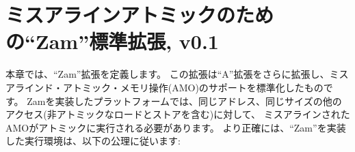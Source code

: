 \begin{comment}
\chapter{``Zam'' Standard Extension for Misaligned Atomics, v0.1}
\end{comment}
\chapter{ミスアラインアトミックのための``Zam''標準拡張, v0.1}
\label{sec:zam}

\begin{comment}
This chapter defines the ``Zam'' extension, which extends the ``A'' extension by standardizing support for misaligned atomic memory operations (AMOs).
On platforms implementing ``Zam'', misaligned AMOs need only execute atomically with respect
to other accesses (including non-atomic loads and stores) to the same address and of the same size.
More precisely, execution environments implementing ``Zam'' are subject to the following axiom:
\newcommand{\misalignedatomicityaxiom}{If $r$ and $w$ are paired misaligned load and store instructions from a hart $h$ with the same address and of the same size, then there can be no store instruction $s$ from a hart other than $h$ with the same address and of the same size as $r$ and $w$ such that a store operation generated by $s$ lies in between memory operations generated by $r$ and $w$ in the global memory order.  Furthermore, there can be no load instruction $l$ from a hart other than $h$ with the same address and of the same size as $r$ and $w$ such that a load operation generated by $l$ lies between two memory operations generated by $r$ or by $w$ in the global memory order.}
\end{comment}
本章では、``Zam''拡張を定義します。
この拡張は``A''拡張をさらに拡張し、ミスアラインド・アトミック・メモリ操作(AMO)のサポートを標準化したものです。
Zamを実装したプラットフォームでは、同じアドレス、同じサイズの他のアクセス(非アトミックなロードとストアを含む)に対して、
ミスアラインされたAMOがアトミックに実行される必要があります。
より正確には、``Zam''を実装した実行環境は、以下の公理に従います:
\newcommand{\misalignedatomicityaxiom}{$r$と$w$が同じアドレスで同じサイズのhart$h$からの対になったミスアラインドのロード命令とストア命令であるとすると、$r$と$w$と同じアドレスで同じサイズのhart以外からのストア命令$s$が存在せず、$s$によって生成されたストアオペレーションがグローバルメモリの順序で$r$と$w$によって生成されたメモリオペレーションの間に位置するようなことがあります。 さらに、$h$以外のhartからのロード命令$l$は、$r$、$w$と同じアドレス、同じサイズで、$l$によって生成されたロード操作が、グローバルメモリ順で$r$または$w$によって生成された2つのメモリ操作の間に位置するような命令は存在しません。}

